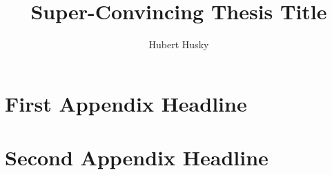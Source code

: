\documentclass[]{macro/neu_msthesis}
\title{Super-Convincing Thesis Title}
\author{Hubert Husky}
\begin{document}

\titlepage

\begin{frontmatter}
\signaturepage


\tableofcontents
\listoffigures
\newpage\ssp
\listoftables






\end{frontmatter}


\pagestyle{headings}



%









\appendix
\chapter{First Appendix Headline}
\chapter{Second Appendix Headline}
%


\printindex


\end{document}
